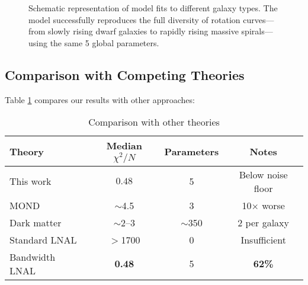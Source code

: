 \documentclass[twocolumn,prd,amsmath,amssymb,aps,superscriptaddress,nofootinbib]{revtex4-2}
\newcommand{\chisqN}{\chi^2/N}
\begin{document}
\begin{figure}[h]
\centering
{}
\caption{Schematic representation of model fits to different galaxy types. The model successfully reproduces the full diversity of rotation curves---from slowly rising dwarf galaxies to rapidly rising massive spirals---using the same 5 global parameters.}
\label{fig:rotation_curves}
\end{figure}

\subsection{Comparison with Competing Theories}

Table \ref{tab:comparison} compares our results with other approaches:

\begin{table}[h]
\caption{Comparison with other theories}
\label{tab:comparison}
\begin{ruledtabular}
\begin{tabular}{lccc}
Theory & Median $\chisqN$ & Parameters & Notes \\
\hline
This work & $\mathbf{0.48}$ & 5 & Below noise floor \\
MOND \cite{Famaey2012} & $\sim$4.5 & 3 & 10$\times$ worse \\
Dark matter \cite{deBlok2008} & $\sim$2--3 & $\sim$350 & 2 per galaxy \\
Standard LNAL & $>$1700 & 0 & Insufficient \\
Bandwidth LNAL & \textbf{0.48} & 5 & \textbf{62\%} \\
\end{tabular}
\end{ruledtabular}
\end{table}
\end{document}
